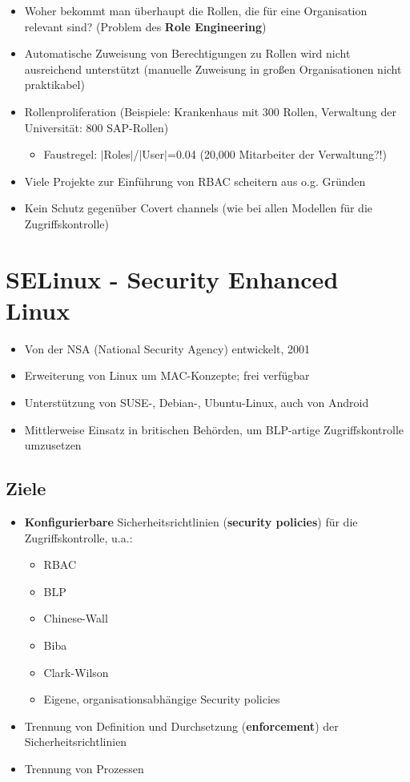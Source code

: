 \documentclass[openany]{book}
\begin{document}
\begin{itemize}
    \item Woher bekommt man überhaupt die Rollen, die für eine Organisation relevant sind? (Problem des \textbf{Role Engineering})
    \item Automatische Zuweisung von Berechtigungen zu Rollen wird nicht ausreichend unterstützt (manuelle Zuweisung in großen Organisationen nicht praktikabel)
    \item Rollenproliferation (Beispiele: Krankenhaus mit 300 Rollen, Verwaltung der Universität: 800 SAP-Rollen)
    \begin{itemize}
        \item Faustregel: $|$Roles$|$/$|$User$|$=0.04 (20,000 Mitarbeiter der Verwaltung?!)
    \end{itemize}
    \item Viele Projekte zur Einführung von RBAC scheitern aus o.g. Gründen
    \item Kein Schutz gegenüber Covert channels (wie bei allen Modellen für die Zugriffskontrolle)
\end{itemize}

\section{SELinux - Security Enhanced Linux}

\begin{itemize}
    \item Von der NSA (National Security Agency) entwickelt, 2001
    \item Erweiterung von Linux um MAC-Konzepte; frei verfügbar
    \item Unterstützung von SUSE-, Debian-, Ubuntu-Linux, auch von Android
    \item Mittlerweise Einsatz in britischen Behörden, um BLP-artige Zugriffskontrolle umzusetzen
\end{itemize}

\subsection{Ziele}

\begin{itemize}
    \item \textbf{Konfigurierbare} Sicherheitsrichtlinien (\textbf{security policies}) für die Zugriffskontrolle, u.a.:
    \begin{itemize}
        \item RBAC
        \item BLP
        \item Chinese-Wall
        \item Biba
        \item Clark-Wilson
        \item Eigene, organisationsabhängige Security policies
    \end{itemize}
    \item Trennung von Definition und Durchsetzung (\textbf{enforcement}) der Sicherheitsrichtlinien
    \item Trennung von Prozessen
\end{itemize}
\end{document}
